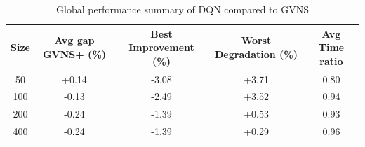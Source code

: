 \begin{table}[ht]
\centering
\small
\setlength{\tabcolsep}{8pt}
\caption{Global performance summary of DQN compared to GVNS}
\vspace{3mm}
\begin{tabular}{ccccc}
\toprule
\textbf{Size} & \textbf{Avg gap GVNS+ (\%)} & \textbf{Best Improvement (\%)} & \textbf{Worst Degradation (\%)} & \textbf{Avg Time ratio} \\
\midrule
50  & +0.14 & -3.08 & +3.71 & 0.80 \\
100 & -0.13 & -2.49 & +3.52 & 0.94 \\
200 & -0.24 & -1.39 & +0.53 & 0.93 \\
400 & -0.24 & -1.39 & +0.29 & 0.96 \\
\bottomrule
\end{tabular}
\label{tab:dqn_global_summary}
\end{table}